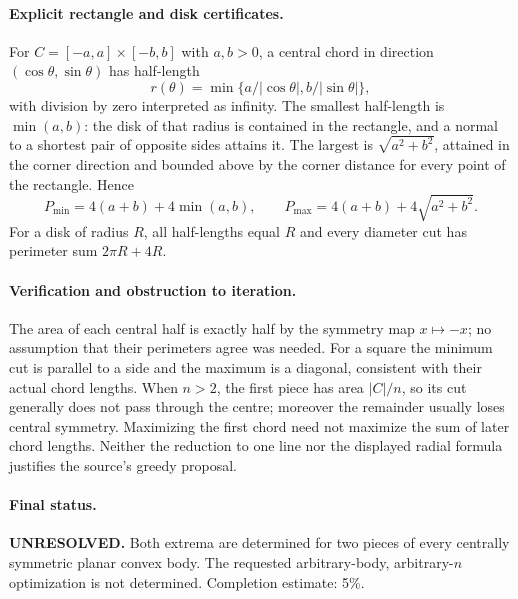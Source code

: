 \documentclass[11pt,a4paper]{article}
\begin{document}
\paragraph{Explicit rectangle and disk certificates.}
For $C=[-a,a]\times[-b,b]$ with $a,b>0$, a central chord in direction
$(\cos\theta,\sin\theta)$ has half-length
\[
 r(\theta)=\min\{a/|\cos\theta|,b/|\sin\theta|\},
\]
with division by zero interpreted as infinity. The smallest half-length is
$\min(a,b)$: the disk of that radius is contained in the rectangle, and a
normal to a shortest pair of opposite sides attains it. The largest is
$\sqrt{a^2+b^2}$, attained in the corner direction and bounded above by the
corner distance for every point of the rectangle. Hence
\[
 P_{\min}=4(a+b)+4\min(a,b),\qquad
 P_{\max}=4(a+b)+4\sqrt{a^2+b^2}.
\]
For a disk of radius $R$, all half-lengths equal $R$ and every diameter cut
has perimeter sum $2\pi R+4R$.

\paragraph{Verification and obstruction to iteration.}
The area of each central half is exactly half by the symmetry map $x\mapsto-x$;
no assumption that their perimeters agree was needed. For a square the
minimum cut is parallel to a side and the maximum is a diagonal, consistent
with their actual chord lengths. When $n>2$, the first piece has area
$|C|/n$, so its cut generally does not pass through the centre; moreover the
remainder usually loses central symmetry. Maximizing the first chord need
not maximize the sum of later chord lengths. Neither the reduction to one
line nor the displayed radial formula justifies the source's greedy proposal.

\paragraph{Final status.}
\textbf{UNRESOLVED.} Both extrema are determined for two pieces of every
centrally symmetric planar convex body. The requested arbitrary-body,
arbitrary-$n$ optimization is not determined. Completion estimate: 5\%.
\end{document}
